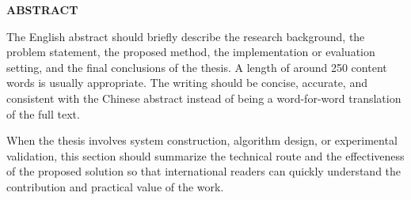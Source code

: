 \begin{center}
  {\thesiswesternfont\fontsize{18pt}{27pt}\selectfont\bfseries ABSTRACT}
\end{center}

\vspace{1.5\baselineskip}

{\thesiswesternfont{}
The English abstract should briefly describe the research background, the problem statement, the proposed method, the implementation or evaluation setting, and the final conclusions of the thesis. A length of around 250 content words is usually appropriate. The writing should be concise, accurate, and consistent with the Chinese abstract instead of being a word-for-word translation of the full text.

When the thesis involves system construction, algorithm design, or experimental validation, this section should summarize the technical route and the effectiveness of the proposed solution so that international readers can quickly understand the contribution and practical value of the work.
\par}

\vspace{\baselineskip}


